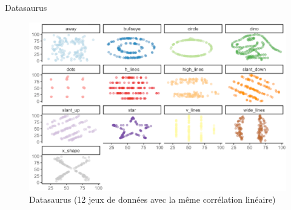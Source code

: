 \documentclass[
  ignorenonframetext,
]{beamer}
\begin{document}
\begin{frame}{Datasaurus}
\protect\hypertarget{datasaurus}{}
\begin{figure}

{\centering \includegraphics{figures/DataSaurusDozen.pdf}

}

\caption{Datasaurus (12 jeux de données avec la même corrélation
linéaire)}

\end{figure}
\end{frame}
\end{document}
